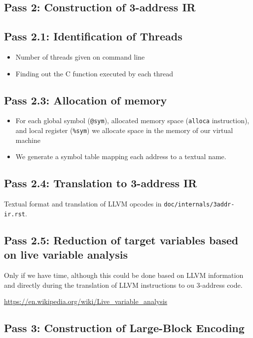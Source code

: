 \documentclass{llncs}
\begin{document}
\subsection*{Pass 2: Construction of 3-address IR}

\subsection*{Pass 2.1: Identification of Threads}

\begin{itemize}
\item Number of threads given on command line
\item Finding out the C function executed by each thread
\end{itemize}

\subsection*{Pass 2.3: Allocation of memory}

\begin{itemize}
\item
  For each global symbol (\verb!@sym!), allocated memory space (\verb!alloca!
  instruction), and local register (\verb!%sym!) we allocate space in the
  memory of our virtual machine
\item
  We generate a symbol table mapping each address to a textual name.
\end{itemize}

\subsection*{Pass 2.4: Translation to 3-address IR}

Textual format and translation of LLVM opcodes in
\verb!doc/internals/3addr-ir.rst!.

\subsection*{Pass 2.5: Reduction of target variables based on live variable
analysis}

Only if we have time, although this could be done based on LLVM information and
directly during the translation of LLVM instructions to ou 3-address code.

\url{https://en.wikipedia.org/wiki/Live_variable_analysis}

\subsection*{Pass 3: Construction of Large-Block Encoding}
\end{document}
